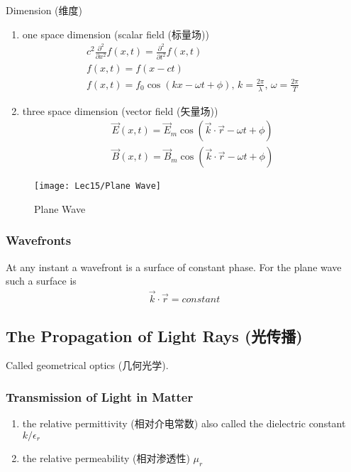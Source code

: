 Dimension (维度)
\begin{enumerate}
    \item one space dimension (scalar field (标量场)) \begin{align*}
        c^2\frac{\partial ^2}{\partial x^2}f(x, t)=\frac{\partial ^2}{\partial t^2}f(x, t)\\
        f(x, t)=f(x-ct)\\
        f(x,t)=f_0 \cos \left( kx-\omega t + \phi \right)
        , \,k=\frac{2\pi }{\lambda}, \, \omega=\frac{2 \pi }{T}
    \end{align*}
    \item three space dimension (vector field (矢量场))\begin{align*}
        \vec{E }(x,t) =\vec{E }_m \cos (\vec{k }\cdot\vec{r }-\omega t+\phi)\\
        \vec{B }(x,t) =\vec{B }_m \cos (\vec{k }\cdot\vec{r }-\omega t+\phi)
    \end{align*}
\end{enumerate}

\begin{figure}[H]
    \centering
    \texttt{[image: Lec15/Plane Wave]}
    \caption{Plane Wave}
\end{figure}

\subsubsection{Wavefronts}
At any instant a wavefront is a surface of constant phase. For the plane wave such a surface is
\begin{align*}
    \vec{k }\cdot \vec{r }=constant
\end{align*}

\subsection[The Propagation of Light Rays]{The Propagation of Light Rays (光传播)}
Called geometrical optics (几何光学). 
\subsubsection{Transmission of Light in Matter}
\begin{enumerate}
    \item the relative permittivity (相对介电常数) also called the dielectric constant $k/\epsilon_r$
    \item the relative permeability (相对渗透性) $\mu_r$
\end{enumerate}

